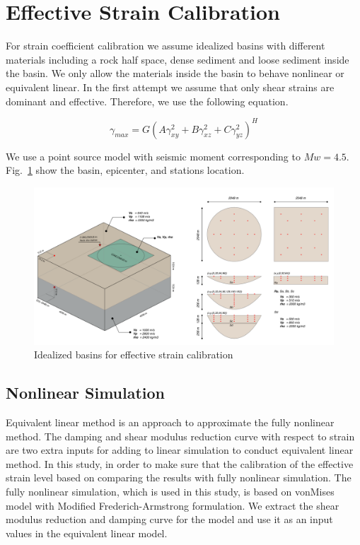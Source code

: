 \section{Effective Strain Calibration}

For strain coefficient calibration we assume idealized basins with  different materials including a rock half space, dense sediment and loose sediment inside the basin. We only allow the materials inside the basin to behave nonlinear or equivalent linear.  In the first attempt we assume that only shear strains are dominant and effective. Therefore, we use the following equation.

 \begin{equation}
 \gamma_{max} = G(A \gamma_{xy}^{2} + B\gamma_{xz}^{2} + C\gamma_{yz}^{2} )^H
 \end{equation}


 We use a point source model with seismic moment corresponding to $Mw=4.5$. Fig.~\ref{fig:study_region} show the basin, epicenter, and stations location. 

\begin{figure}[H]
    \centering
    \includegraphics[width=\textwidth]{figures/pdf/study_region.pdf}
    \caption{Idealized basins for effective strain calibration}
    \label{fig:study_region}
\end{figure}


\subsection{Nonlinear Simulation}

Equivalent linear method is an approach to approximate the fully nonlinear method. The damping and shear modulus reduction curve with respect to strain are two extra inputs for adding to linear simulation to conduct equivalent linear method. In this study, in order to make sure that the calibration of the effective strain level based on comparing the results with fully nonlinear simulation. The fully nonlinear simulation, which is used in this study, is based on vonMises model with Modified Frederich-Armstrong formulation. We extract the shear modulus reduction and damping curve for the model and use it as an input values in the equivalent linear model. 

